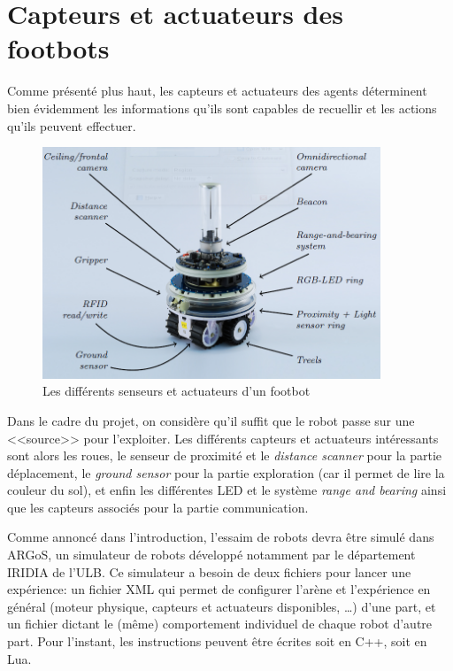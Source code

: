 \section{Capteurs et actuateurs des footbots}

Comme présenté plus haut, les capteurs et actuateurs des agents déterminent bien évidemment les informations qu'ils sont capables de recuellir et les actions qu'ils peuvent effectuer.

\begin{figure}[htb]
  \centering
  \includegraphics[width=0.9\textwidth]{pics/footbot.png}
  \caption{Les différents senseurs et actuateurs d'un footbot~\cite{argosSite1}}
\end{figure}

Dans le cadre du projet, on considère qu'il suffit que le robot passe sur une <<source>> pour l'exploiter. Les différents capteurs et actuateurs intéressants sont alors les roues, le senseur de proximité et le \emph{distance scanner} pour la partie déplacement, le \emph{ground sensor} pour la partie exploration (car il permet de lire la couleur du sol), et enfin les différentes LED et le système \emph{range and bearing} ainsi que les capteurs associés pour la partie communication.

Comme annoncé dans l'introduction, l'essaim de robots devra être simulé dans ARGoS, un simulateur de robots développé notamment par le département IRIDIA de l'ULB. Ce simulateur a besoin de deux fichiers pour lancer une expérience: un fichier XML qui permet de configurer l'arène et l'expérience en général (moteur physique, capteurs et actuateurs disponibles, \ldots) \cite{argosReport} d'une part, et un fichier dictant le (même) comportement individuel de chaque robot d'autre part. Pour l'instant, les instructions peuvent être écrites soit en C++, soit en Lua.


